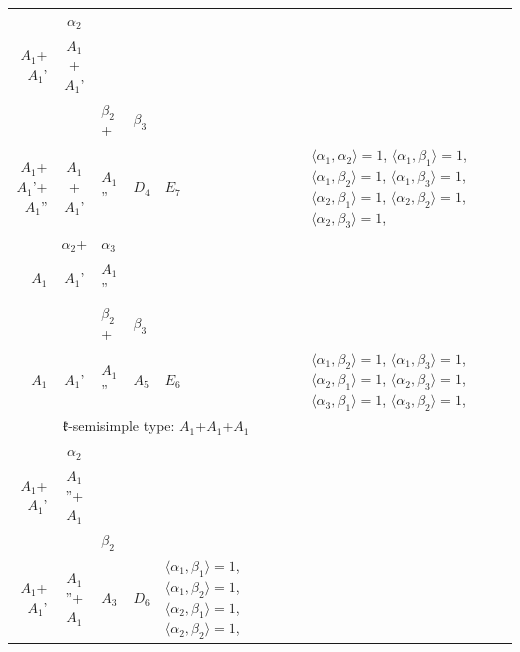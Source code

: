 \documentclass[12pt]{report}
\begin{document}
\begin{appendix}
{\begin{longtable}{rcl p{1cm}p{1cm}p{3cm} }
\\
\begin{tabular}{cc}$\alpha_1$+ & $\alpha_2$\\\tiny{ $A_1$+$A_1$' } & \tiny{ $A_1$+$A_1$' }\end{tabular} &\begin{tabular}{c} = \\~ \end{tabular} & \begin{tabular}{ccc}$\beta_1$+ & $\beta_2$+ & $\beta_3$\\\tiny{ $A_1$+$A_1$'+$A_1$'' } & \tiny{ $A_1$+$A_1$' } & \tiny{ $A_1$'' }\end{tabular} & $D_4$ & $E_7$ & $\langle\alpha_1, \alpha_2\rangle=1$,  $\langle\alpha_1, \beta_1\rangle=1$, $\langle\alpha_1, \beta_2\rangle=1$, $\langle\alpha_1, \beta_3\rangle=1$, $\langle\alpha_2, \beta_1\rangle=1$, $\langle\alpha_2, \beta_2\rangle=1$, $\langle\alpha_2, \beta_3\rangle=1$, 
\\
\begin{tabular}{ccc}$\alpha_1$+ & $\alpha_2$+ & $\alpha_3$\\\tiny{ $A_1$ } & \tiny{ $A_1$' } & \tiny{ $A_1$'' }\end{tabular} &\begin{tabular}{c} = \\~ \end{tabular} & \begin{tabular}{ccc}$\beta_1$+ & $\beta_2$+ & $\beta_3$\\\tiny{ $A_1$ } & \tiny{ $A_1$' } & \tiny{ $A_1$'' }\end{tabular} & $A_5$ & $E_6$ &  $\langle\alpha_1, \beta_2\rangle=1$, $\langle\alpha_1, \beta_3\rangle=1$, $\langle\alpha_2, \beta_1\rangle=1$, $\langle\alpha_2, \beta_3\rangle=1$, $\langle\alpha_3, \beta_1\rangle=1$, $\langle\alpha_3, \beta_2\rangle=1$, 
\\
\hline\multicolumn{5}{c}{$\mathfrak{k}$-semisimple type: $A_1$+$A_1$+$A_1$}\\
\hline\hline\begin{tabular}{cc}$\alpha_1$+ & $\alpha_2$\\\tiny{ $A_1$+$A_1$' } & \tiny{ $A_1$''+$A_1$ }\end{tabular} &\begin{tabular}{c} = \\~ \end{tabular} & \begin{tabular}{cc}$\beta_1$+ & $\beta_2$\\\tiny{ $A_1$+$A_1$' } & \tiny{ $A_1$''+$A_1$ }\end{tabular} & $A_3$ & $D_6$ &  $\langle\alpha_1, \beta_1\rangle=1$, $\langle\alpha_1, \beta_2\rangle=1$, $\langle\alpha_2, \beta_1\rangle=1$, $\langle\alpha_2, \beta_2\rangle=1$, 

\end{longtable}}
\end{appendix}
\end{document}

